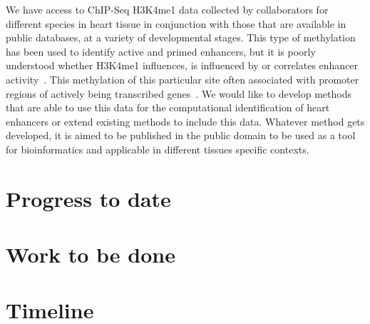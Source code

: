 \documentclass[12pt,a4paper]{article}
\begin{document}
        We have access to ChIP-Seq H3K4me1 data collected by collaborators for different species in heart tissue in conjunction with those that are available in public databases, at a variety of developmental stages. This type of methylation has been used to identify active and primed enhancers, but it is poorly understood whether H3K4me1 influences, is influenced by or correlates enhancer activity~\cite{rada2018h3k4me1}. This methylation of this particular site often associated with promoter regions of actively being transcribed genes~\cite{barski2007high}. We would like to develop methods that are able to use this data for the computational identification of heart enhancers or extend existing methods to include this data. Whatever method gets developed, it is aimed to be published in the public domain to be used as a tool for bioinformatics and applicable in different tissues specific contexts.  
        
    \section{Progress to date}
    
    
    \section{Work to be done}
    
    
    
    \section{Timeline}
\end{document}
